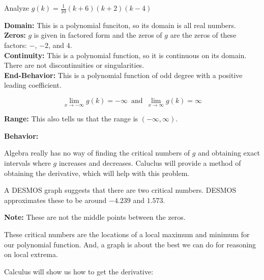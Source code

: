 \documentclass{ximera}
\begin{document}
\begin{example}  Analyze   $g(k) = \frac{1}{10} (k+6)(k+2)(k-4)$


\textbf{Domain: } This is a polynomial funciton, so its domain is all real numbers. \\



\textbf{Zeros: } $g$ is given in factored form and the zeros of $g$ are the zeros of these factors: $-$, $-2$, and $4$.\\



\textbf{Continuity: } This is a polynomial function, so it is continuous on its domain. There are not discontinuities or singularities.\\



\textbf{End-Behavior: }  This is a polynomial function of odd degree with a positive leading coefficient.


\[  \lim\limits_{x \to -\infty} g(k) = -\infty  \,   \text{ and }     \,   \lim\limits_{x \to \infty} g(k) = \infty    \]



\textbf{Range: } This also tells us that the range is $(-\infty, \infty)$.

\textbf{Behavior: }


Algebra really has no way of finding the critical numbers of $g$ and obtaining exact intervals where $g$ increases and decreases.  Caluclus will provide a method of obtaining the derivative, which will help with this problem. 



A DESMOS graph suggests that there are two critical numbers.  DESMOS approximates these to be around $-4.239$ and $1.573$.

\textbf{Note: } These are not the middle points between the zeros.


These critical numbers are the locations of a local maximum and minimum for our polynomial function.  And, a graph is about the best we can do for reasoning on local extrema.





\begin{center}
\end{center}








Calculus will show us how to get the derivative:


\end{example}
\end{document}
